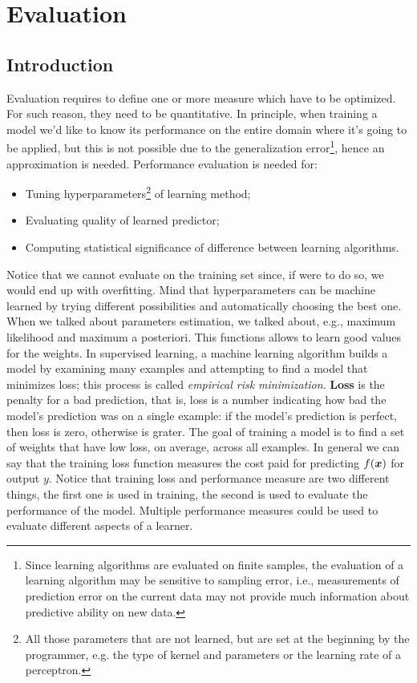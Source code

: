 \chapter{Evaluation}
\section{Introduction}
Evaluation requires to define one or more measure which have to be optimized. For such reason, they need to be quantitative. \newline
In principle, when training a model we'd like to know its performance on the entire domain where it's going to be applied, but this is not possible due to the generalization error\footnote{Since learning algorithms are evaluated on finite samples, the evaluation of a learning algorithm may be sensitive to sampling error, i.e., measurements of prediction error on the current data may not provide much information about predictive ability on new data.}, hence an approximation is needed.\newline
Performance evaluation is needed for:
\begin{itemize}
  \item Tuning hyperparameters\footnote{All those parameters that are not learned, but are set at the beginning by the programmer, e.g. the type of kernel and parameters or the learning rate of a perceptron.} of learning method;
  \item Evaluating quality of learned predictor;
  \item Computing statistical significance of difference between learning algorithms.
\end{itemize}
Notice that we cannot evaluate on the training set since, if were to do so, we would end up with overfitting. \newline
Mind that hyperparameters can be machine learned by trying different possibilities and automatically choosing the best one. \newline
When we talked about parameters estimation, we talked about, e.g., maximum likelihood and maximum a posteriori. This functions allows to learn good values for the weights. In supervised learning, a machine learning algorithm builds a model by examining many examples and attempting to find a model that minimizes loss; this process is called \textit{empirical risk minimization}. \textbf{Loss} is the penalty for a bad prediction, that is, loss is a number indicating how bad the model's prediction was on a single example: if the model's prediction is perfect, then loss is zero, otherwise is grater. The goal of training a model is to find a set of weights that have low loss, on average, across all examples.  \newline
In general we can say that the training loss function measures the cost paid for predicting $f(\bm{x})$ for output $y$. \newline
Notice that training loss and performance measure are two different things, the first one is used in training, the second is used to evaluate the performance of the model. \newline
Multiple performance measures could be used to evaluate different aspects of a learner. 
%
%
%
